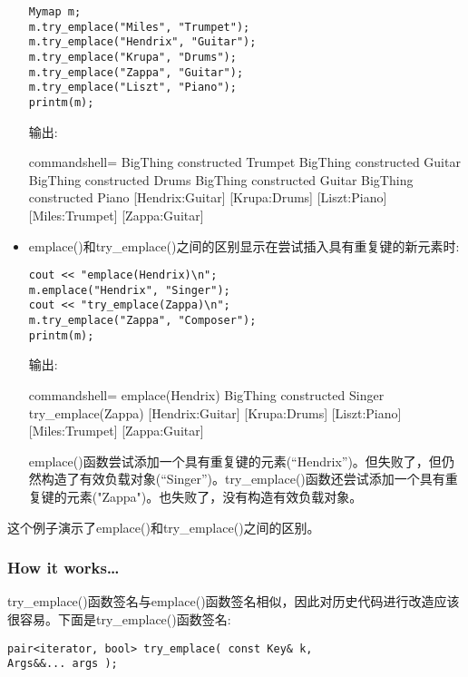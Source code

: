 \begin{itemize}
\begin{lstlisting}[style=styleCXX]
Mymap m;
m.try_emplace("Miles", "Trumpet");
m.try_emplace("Hendrix", "Guitar");
m.try_emplace("Krupa", "Drums");
m.try_emplace("Zappa", "Guitar");
m.try_emplace("Liszt", "Piano");
printm(m);
\end{lstlisting}

输出:

\begin{tcblisting}{commandshell={}}
BigThing constructed Trumpet
BigThing constructed Guitar
BigThing constructed Drums
BigThing constructed Guitar
BigThing constructed Piano
[Hendrix:Guitar] [Krupa:Drums] [Liszt:Piano]
[Miles:Trumpet] [Zappa:Guitar]
\end{tcblisting}

\item 
emplace()和try\_emplace()之间的区别显示在尝试插入具有重复键的新元素时:

\begin{lstlisting}[style=styleCXX]
cout << "emplace(Hendrix)\n";
m.emplace("Hendrix", "Singer");
cout << "try_emplace(Zappa)\n";
m.try_emplace("Zappa", "Composer");
printm(m);
\end{lstlisting}

输出:

\begin{tcblisting}{commandshell={}}
emplace(Hendrix)
BigThing constructed Singer
try_emplace(Zappa)
[Hendrix:Guitar] [Krupa:Drums] [Liszt:Piano]
[Miles:Trumpet] [Zappa:Guitar]
\end{tcblisting}

emplace()函数尝试添加一个具有重复键的元素(“Hendrix”)。但失败了，但仍然构造了有效负载对象(“Singer”)。try\_emplace()函数还尝试添加一个具有重复键的元素("Zappa")。也失败了，没有构造有效负载对象。
\end{itemize}

这个例子演示了emplace()和try\_emplace()之间的区别。

\subsubsection{How it works…}

try\_emplace()函数签名与emplace()函数签名相似，因此对历史代码进行改造应该很容易。下面是try\_emplace()函数签名:

\begin{lstlisting}[style=styleCXX]
pair<iterator, bool> try_emplace( const Key& k,
Args&&... args );
\end{lstlisting}

